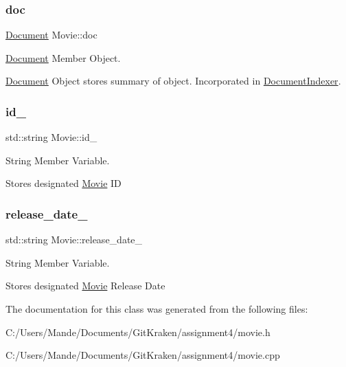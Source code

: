 \subsubsection{\texorpdfstring{doc}{doc}}
{\footnotesize\ttfamily \hyperlink{class_document}{Document} Movie\+::doc\hspace{0.3cm}{\ttfamily [private]}}



\hyperlink{class_document}{Document} Member Object. 

\hyperlink{class_document}{Document} Object stores summary of object. Incorporated in \hyperlink{class_document_indexer}{Document\+Indexer}. \mbox{\label{class_movie_a7cee82dbea485a5cbe98d850fb1ae253}} 
\subsubsection{\texorpdfstring{id\+\_\+}{id\_}}
{\footnotesize\ttfamily std\+::string Movie\+::id\+\_\+\hspace{0.3cm}{\ttfamily [private]}}



String Member Variable. 

Stores designated \hyperlink{class_movie}{Movie} ID \mbox{\label{class_movie_a34bde460ddda08989206136b9b07aebf}} 
\subsubsection{\texorpdfstring{release\+\_\+date\+\_\+}{release\_date\_}}
{\footnotesize\ttfamily std\+::string Movie\+::release\+\_\+date\+\_\+\hspace{0.3cm}{\ttfamily [private]}}



String Member Variable. 

Stores designated \hyperlink{class_movie}{Movie} Release Date 

The documentation for this class was generated from the following files\+:\begin{DoxyCompactItemize}
\item 
C\+:/\+Users/\+Mande/\+Documents/\+Git\+Kraken/assignment4/movie.\+h\item 
C\+:/\+Users/\+Mande/\+Documents/\+Git\+Kraken/assignment4/movie.\+cpp\end{DoxyCompactItemize}
